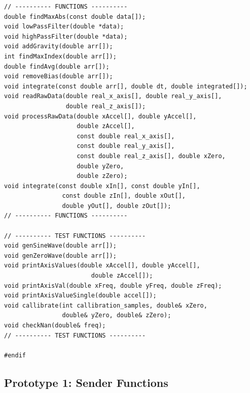\begin{verbatim}
// ---------- FUNCTIONS ----------
double findMaxAbs(const double data[]);
void lowPassFilter(double *data);
void highPassFilter(double *data);
void addGravity(double arr[]);
int findMaxIndex(double arr[]);
double findAvg(double arr[]);
void removeBias(double arr[]);
void integrate(const double arr[], double dt, double integrated[]);
void readRawData(double real_x_axis[], double real_y_axis[], 
                 double real_z_axis[]);
void processRawData(double xAccel[], double yAccel[], 
                    double zAccel[], 
                    const double real_x_axis[], 
                    const double real_y_axis[], 
                    const double real_z_axis[], double xZero, 
                    double yZero, 
                    double zZero);
void integrate(const double xIn[], const double yIn[], 
                const double zIn[], double xOut[], 
                double yOut[], double zOut[]);
// ---------- FUNCTIONS ----------

// ---------- TEST FUNCTIONS ----------
void genSineWave(double arr[]);
void genZeroWave(double arr[]);
void printAxisValues(double xAccel[], double yAccel[], 
                        double zAccel[]);
void printAxisVal(double xFreq, double yFreq, double zFreq);
void printAxisValueSingle(double accel[]);
void callibrate(int callibration_samples, double& xZero, 
                double& yZero, double& zZero);
void checkNan(double& freq);
// ---------- TEST FUNCTIONS ----------

#endif
\end{verbatim}

\subsection{Prototype 1: Sender Functions}


